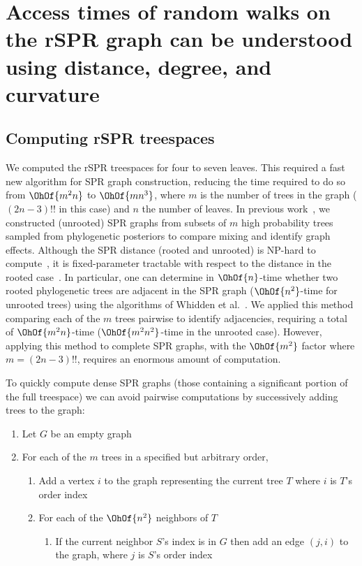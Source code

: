 \documentclass[11pt,onecolumn,conference]{IEEEtran}
\begin{document}
\section{Access times of random walks on the rSPR graph can be understood using distance, degree, and curvature}

\subsection{Computing rSPR treespaces}
\label{sec:computing_treespace}

We computed the rSPR treespaces for four to seven leaves.
This required a fast new algorithm for SPR graph construction, reducing the time required to do so from $\OhOf{m^2 n}$ to $\OhOf{mn^3}$, where $m$ is the number of trees in the graph ($(2n-3)!!$ in this case) and $n$ the number of leaves.
In previous work~\cite{Whidden2015-yi}, we constructed (unrooted) SPR graphs from subsets of $m$ high probability trees sampled from phylogenetic posteriors to compare mixing and identify graph effects.
Although the SPR distance (rooted and unrooted) is NP-hard to compute~\cite{bordewich05,hickey2008sdc}, it is fixed-parameter tractable with respect to the distance in the rooted case~\cite{bordewich05}.
In particular, one can determine in $\OhOf{n}$-time whether two rooted phylogenetic trees are adjacent in the SPR graph ($\OhOf{n^2}$-time for unrooted trees) using the algorithms of Whidden et al.~\cite{whidden2009unifying,whidden2010fast, whidden2013hybridization,Whidden2015-yi}.
We applied this method comparing each of the $m$ trees pairwise to identify adjacencies, requiring a total of $\OhOf{m^2n}$-time ($\OhOf{m^2n^2}$-time in the unrooted case).
However, applying this method to complete SPR graphs, with the $\OhOf{m^2}$ factor where $m = (2n-3)!!$, requires an enormous amount of computation.

To quickly compute dense SPR graphs (those containing a significant portion of the full treespace) we can avoid pairwise computations by successively adding trees to the graph:
\begin{enumerate}[label={\arabic*}.]
	\item Let $G$ be an empty graph
	\item For each of the $m$ trees in a specified but arbitrary order,
		\begin{enumerate}
			\item Add a vertex $i$ to the graph representing the current tree $T$ where $i$ is $T$'s order index
			\item For each of the $\OhOf{n^2}$ neighbors of $T$
				\begin{enumerate}
					\item If the current neighbor $S$'s index is in $G$ then add an edge $(j,i)$ to the graph, where $j$ is $S$'s order index
				\end{enumerate}
		\end{enumerate}
\end{enumerate}
\end{document}
